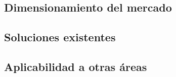 \subsection{Dimensionamiento del mercado}
\label{sec:mercado}

\subsection{Soluciones existentes}
\label{sec:existentes}


%


\subsection{Aplicabilidad a otras áreas}





